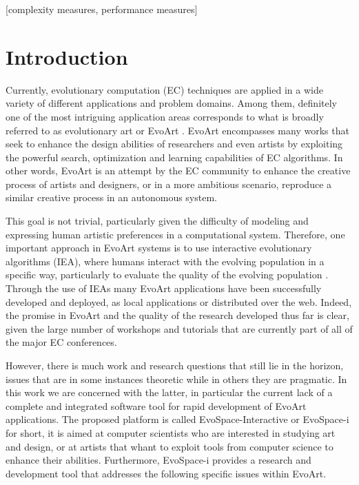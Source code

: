\documentclass{sig-alternate}
\begin{document}
[complexity measures, performance measures]



\section{Introduction}
Currently, evolutionary computation (EC) techniques are applied in a wide variety of different applications and problem domains.
Among them, definitely one of the most intriguing application areas corresponds to what is broadly referred to as evolutionary art or EvoArt  \cite{Bentley:1999:intro,ie1}.
EvoArt encompasses many works that seek to enhance the design abilities of researchers and even artists by exploiting the powerful search, optimization
and learning capabilities of EC algorithms.
In other words, EvoArt is an attempt by the EC community to enhance the creative process of artists and designers,
or in a more ambitious scenario, reproduce a similar creative process in an autonomous system.

This goal is not trivial, particularly given the difficulty of modeling and expressing human artistic preferences in a computational system.
Therefore, one important approach in EvoArt systems is to use interactive evolutionary algorithms (IEA),
where humans interact with the evolving population in a specific way, particularly to evaluate the quality of the evolving population \cite{ie1,ie2}.
Through the use of IEAs many EvoArt applications have been successfully developed and deployed, as local applications or distributed over the web.
Indeed, the promise in EvoArt and the quality of the research developed thus far is clear, given the large number of workshops and tutorials that
are currently part of all of the major EC conferences.

However, there is much work and research questions that still lie in the horizon, issues that are in some instances theoretic while in others they are pragmatic.
In this work we are concerned with the latter, in particular the current lack of a complete and integrated software tool for rapid development
of EvoArt applications.
The proposed platform is called EvoSpace-Interactive or EvoSpace-i for short, it is aimed at computer scientists who are interested in studying art and design, or at artists that whant
to exploit tools from computer science to enhance their abilities.
Furthermore, EvoSpace-i provides a research and development tool that addresses the following specific issues within EvoArt.
\end{document}
